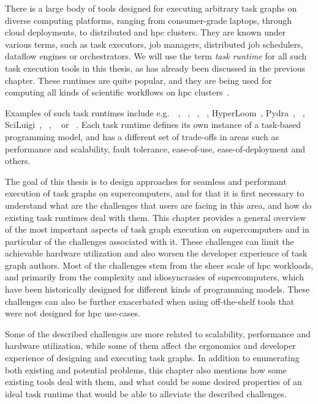 There is a large body of tools designed for executing arbitrary task graphs on diverse computing
platforms, ranging from consumer-grade laptops, through cloud deployments, to distributed and
\gls{hpc} clusters. They are known under various terms, such as task executors,
job managers, distributed job schedulers, dataflow engines or orchestrators. We will use the term
\emph{task runtime} for all such task execution tools in this thesis, as has already been
discussed in the previous chapter. These runtimes are quite popular, and they are being used for
computing all kinds of scientific workflows on \gls{hpc}
clusters~\cite{hpc_tasks, hpc_tasks_2, hpc_tasks_3, pegasus}.

Examples of such task runtimes include e.g.\ \dask~\cite{dask},
\parsl~\cite{parsl}, \ray~\cite{ray},
\pycompss~\cite{pycompss}, HyperLoom~\cite{hyperloom},
Pydra~\cite{pydra}, \snakemake~\cite{snakemake},
SciLuigi~\cite{sciluigi}, \merlin~\cite{merlin},
\autosubmit~\cite{autosubmit} or \fireworks~\cite{fireworks}. Each task runtime
defines its own instance of a task-based programming model, and has a different set of trade-offs
in areas such as performance and scalability, fault tolerance, ease-of-use, ease-of-deployment and
others.

The goal of this thesis is to design approaches for seamless and performant execution of task
graphs on supercomputers, and for that it is first necessary to understand what are the challenges
that users are facing in this area, and how do existing task runtimes deal with them. This chapter
provides a general overview of the most important aspects of task graph execution on supercomputers
and in particular of the challenges associated with it. These challenges can limit the achievable
hardware utilization and also worsen the developer experience of task graph authors. Most of the
challenges stem from the sheer scale of \gls{hpc} workloads, and primarily from
the complexity and idiosyncrasies of supercomputers, which have been historically designed for
different kinds of programming models. These challenges can also be further exacerbated when using
off-the-shelf tools that were not designed for \gls{hpc} use-cases.

Some of the described challenges are more related to scalability, performance and hardware
utilization, while some of them affect the ergonomics and developer experience of designing and
executing task graphs. In addition to enumerating both existing and potential problems, this
chapter also mentions how some existing tools deal with them, and what could be some desired
properties of an ideal task runtime that would be able to alleviate the described challenges.

